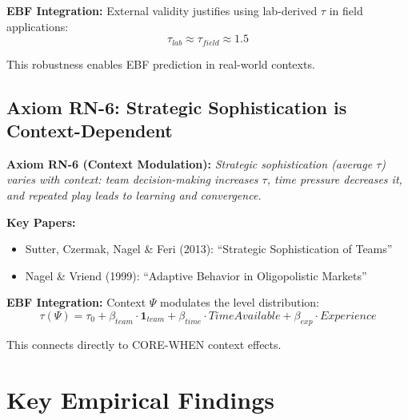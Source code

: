 \textbf{EBF Integration:}
External validity justifies using lab-derived $\tau$ in field applications:
\begin{equation}
\tau_{lab} \approx \tau_{field} \approx 1.5
\end{equation}

This robustness enables EBF prediction in real-world contexts.

\subsection{Axiom RN-6: Strategic Sophistication is Context-Dependent}

\begin{tcolorbox}[colback=blue!5!white, colframe=blue!75!black]
\textbf{Axiom RN-6 (Context Modulation):}
\textit{Strategic sophistication (average $\tau$) varies with context: team decision-making increases $\tau$, time pressure decreases it, and repeated play leads to learning and convergence.}
\end{tcolorbox}

\textbf{Key Papers:}
\begin{itemize}[nosep]
    \item Sutter, Czermak, Nagel \& Feri (2013): ``Strategic Sophistication of Teams''
    \item Nagel \& Vriend (1999): ``Adaptive Behavior in Oligopolistic Markets''
\end{itemize}

\textbf{EBF Integration:}
Context $\Psi$ modulates the level distribution:
\begin{equation}
\tau(\Psi) = \tau_0 + \beta_{team} \cdot \mathbf{1}_{team} + \beta_{time} \cdot TimeAvailable + \beta_{exp} \cdot Experience
\end{equation}

This connects directly to CORE-WHEN context effects.

\section{Key Empirical Findings}


